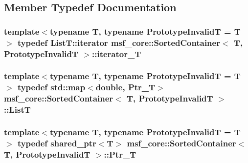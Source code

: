 \subsection{Member Typedef Documentation}
\hypertarget{classmsf__core_1_1SortedContainer_ac060dafe3a40d73ef6d35f4be7e0213e}{
\subsubsection[{iterator\-\_\-\-T}]{\setlength{\rightskip}{0pt plus 5cm}template$<$typename T, typename Prototype\-Invalid\-T = T$>$ typedef List\-T\-::iterator {\bf msf\-\_\-core\-::\-Sorted\-Container}$<$ T, Prototype\-Invalid\-T $>$\-::{\bf iterator\-\_\-\-T}}}\label{classmsf__core_1_1SortedContainer_ac060dafe3a40d73ef6d35f4be7e0213e}
\hypertarget{classmsf__core_1_1SortedContainer_abb7bb5ff6c1a1916b8c7e48a50953919}{
\subsubsection[{List\-T}]{\setlength{\rightskip}{0pt plus 5cm}template$<$typename T, typename Prototype\-Invalid\-T = T$>$ typedef std\-::map$<$double, {\bf Ptr\-\_\-\-T}$>$ {\bf msf\-\_\-core\-::\-Sorted\-Container}$<$ T, Prototype\-Invalid\-T $>$\-::{\bf List\-T}\hspace{0.3cm}{\ttfamily [private]}}}\label{classmsf__core_1_1SortedContainer_abb7bb5ff6c1a1916b8c7e48a50953919}
\hypertarget{classmsf__core_1_1SortedContainer_a0dd7e9676bf540e11f526a8ac16da06b}{
\subsubsection[{Ptr\-\_\-\-T}]{\setlength{\rightskip}{0pt plus 5cm}template$<$typename T, typename Prototype\-Invalid\-T = T$>$ typedef shared\-\_\-ptr$<$T$>$ {\bf msf\-\_\-core\-::\-Sorted\-Container}$<$ T, Prototype\-Invalid\-T $>$\-::{\bf Ptr\-\_\-\-T}}}\label{classmsf__core_1_1SortedContainer_a0dd7e9676bf540e11f526a8ac16da06b}


